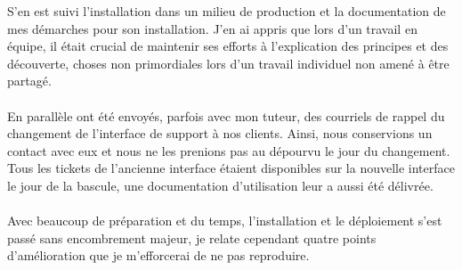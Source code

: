 \noindent S'en est suivi l'installation dans un milieu de production et la documentation de mes démarches pour son installation. J'en ai appris que lors d'un travail en équipe, il était crucial de maintenir ses efforts à l'explication des principes et des découverte, choses non primordiales lors d'un travail individuel non amené à être partagé.
\\ \\
En parallèle ont été envoyés, parfois avec mon tuteur, des courriels de rappel du changement de l'interface de support à nos clients. Ainsi, nous conservions un contact avec eux et nous ne les prenions pas au dépourvu le jour du changement. Tous les tickets de l'ancienne interface étaient disponibles sur la nouvelle interface le jour de la bascule, une documentation d'utilisation leur a aussi été délivrée.
\\ \\
Avec beaucoup de préparation et du temps, l'installation et le déploiement s'est passé sans encombrement majeur, je relate cependant quatre points d'amélioration que je m'efforcerai de ne pas reproduire.

